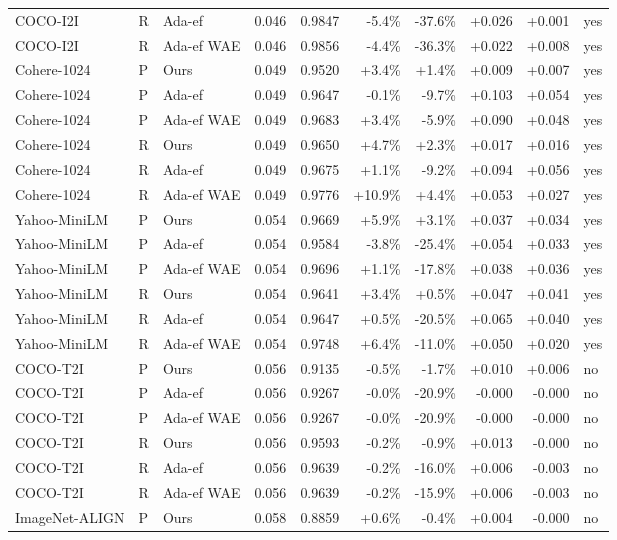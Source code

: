 \begin{tabular}{lllrrrrrrl}
COCO-I2I & R & Ada-ef & 0.046 & 0.9847 & -5.4\% & -37.6\% & +0.026 & +0.001 & yes \\
COCO-I2I & R & Ada-ef WAE & 0.046 & 0.9856 & -4.4\% & -36.3\% & +0.022 & +0.008 & yes \\
Cohere-1024 & P & Ours & 0.049 & 0.9520 & +3.4\% & +1.4\% & +0.009 & +0.007 & yes \\
Cohere-1024 & P & Ada-ef & 0.049 & 0.9647 & -0.1\% & -9.7\% & +0.103 & +0.054 & yes \\
Cohere-1024 & P & Ada-ef WAE & 0.049 & 0.9683 & +3.4\% & -5.9\% & +0.090 & +0.048 & yes \\
Cohere-1024 & R & Ours & 0.049 & 0.9650 & +4.7\% & +2.3\% & +0.017 & +0.016 & yes \\
Cohere-1024 & R & Ada-ef & 0.049 & 0.9675 & +1.1\% & -9.2\% & +0.094 & +0.056 & yes \\
Cohere-1024 & R & Ada-ef WAE & 0.049 & 0.9776 & +10.9\% & +4.4\% & +0.053 & +0.027 & yes \\
Yahoo-MiniLM & P & Ours & 0.054 & 0.9669 & +5.9\% & +3.1\% & +0.037 & +0.034 & yes \\
Yahoo-MiniLM & P & Ada-ef & 0.054 & 0.9584 & -3.8\% & -25.4\% & +0.054 & +0.033 & yes \\
Yahoo-MiniLM & P & Ada-ef WAE & 0.054 & 0.9696 & +1.1\% & -17.8\% & +0.038 & +0.036 & yes \\
Yahoo-MiniLM & R & Ours & 0.054 & 0.9641 & +3.4\% & +0.5\% & +0.047 & +0.041 & yes \\
Yahoo-MiniLM & R & Ada-ef & 0.054 & 0.9647 & +0.5\% & -20.5\% & +0.065 & +0.040 & yes \\
Yahoo-MiniLM & R & Ada-ef WAE & 0.054 & 0.9748 & +6.4\% & -11.0\% & +0.050 & +0.020 & yes \\
COCO-T2I & P & Ours & 0.056 & 0.9135 & -0.5\% & -1.7\% & +0.010 & +0.006 & no \\
COCO-T2I & P & Ada-ef & 0.056 & 0.9267 & -0.0\% & -20.9\% & -0.000 & -0.000 & no \\
COCO-T2I & P & Ada-ef WAE & 0.056 & 0.9267 & -0.0\% & -20.9\% & -0.000 & -0.000 & no \\
COCO-T2I & R & Ours & 0.056 & 0.9593 & -0.2\% & -0.9\% & +0.013 & -0.000 & no \\
COCO-T2I & R & Ada-ef & 0.056 & 0.9639 & -0.2\% & -16.0\% & +0.006 & -0.003 & no \\
COCO-T2I & R & Ada-ef WAE & 0.056 & 0.9639 & -0.2\% & -15.9\% & +0.006 & -0.003 & no \\
ImageNet-ALIGN & P & Ours & 0.058 & 0.8859 & +0.6\% & -0.4\% & +0.004 & -0.000 & no \\

\end{tabular}
